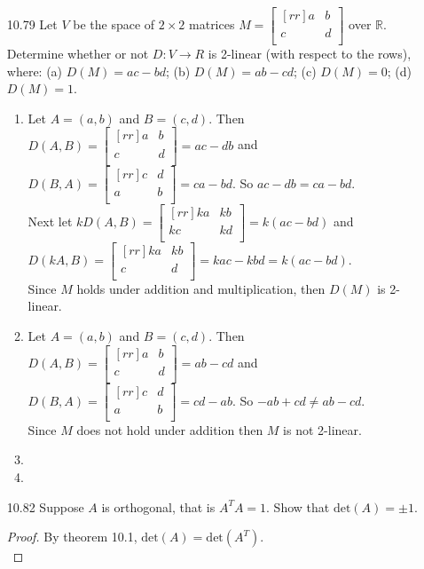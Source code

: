 \documentclass[12pt]{article}
\theoremstyle{definition}
\theoremstyle{plain}
\begin{document}
\begin{enumerate}
\item[10.79]Let $V$ be the space of $2 \times 2$ matrices $M=\begin{bmatrix}[rr]a&b\\c&d\\\end{bmatrix}$ over $\mathbb{R}$. Determine whether or not $D: V\rightarrow R$ is 2-linear (with respect to the rows), where: (a) $D(M)=ac-bd$; (b) $D(M)=ab-cd$; (c) $D(M)=0$; (d) $D(M)=1$.
	\begin{enumerate}
	\item Let $A=(a,b)$ and $B=(c,d)$. Then $D(A,B)=\begin{bmatrix}[rr]a&b\\c&d\\\end{bmatrix}=ac-db$ and $D(B,A)=\begin{bmatrix}[rr]c&d\\a&b\\\end{bmatrix}=ca-bd$. So $ac-db = ca-bd$.\\
	Next let $kD(A,B)=\begin{bmatrix}[rr]ka&kb\\kc&kd\\\end{bmatrix}=k(ac-bd)$ and $D(kA,B)=\begin{bmatrix}[rr]ka&kb\\c&d\\\end{bmatrix}=kac-kbd=k(ac-bd)$.\\
	Since $M$ holds under addition and multiplication, then $D(M)$ is 2-linear.
	\item Let $A=(a,b)$ and $B=(c,d)$. Then $D(A,B)=\begin{bmatrix}[rr]a&b\\c&d\\\end{bmatrix}=ab-cd$ and $D(B,A)=\begin{bmatrix}[rr]c&d\\a&b\\\end{bmatrix}=cd-ab$. So $ -ab+cd \neq ab-cd$.\\
	Since $M$ does not hold under addition then $M$ is not 2-linear.
	\item 
	\item
	\end{enumerate}
	
\item[10.82]Suppose $A$ is orthogonal, that is $A^TA=1$. Show that $\mathrm{det}(A)=\pm 1$.
	\begin{proof}
	By theorem 10.1, $\mathrm{det}(A) = \mathrm{det}(A^T)$.\\
		

\end{proof}
\end{enumerate}
\end{document}
